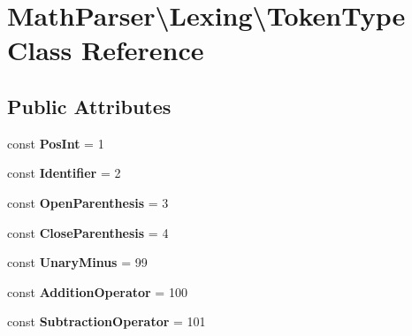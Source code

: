 \hypertarget{classMathParser_1_1Lexing_1_1TokenType}{\section{Math\-Parser\textbackslash{}Lexing\textbackslash{}Token\-Type Class Reference}
\label{classMathParser_1_1Lexing_1_1TokenType}
}
\subsection*{Public Attributes}
\begin{DoxyCompactItemize}
\item 
\hypertarget{classMathParser_1_1Lexing_1_1TokenType_a7312d065593448cb9e873b1d88132749}{const {\bfseries Pos\-Int} = 1}\label{classMathParser_1_1Lexing_1_1TokenType_a7312d065593448cb9e873b1d88132749}

\item 
\hypertarget{classMathParser_1_1Lexing_1_1TokenType_a841cc795a663257447d71c9a31e29945}{const {\bfseries Identifier} = 2}\label{classMathParser_1_1Lexing_1_1TokenType_a841cc795a663257447d71c9a31e29945}

\item 
\hypertarget{classMathParser_1_1Lexing_1_1TokenType_a4b2d997bb88448e1a72e43e171cc6c5f}{const {\bfseries Open\-Parenthesis} = 3}\label{classMathParser_1_1Lexing_1_1TokenType_a4b2d997bb88448e1a72e43e171cc6c5f}

\item 
\hypertarget{classMathParser_1_1Lexing_1_1TokenType_ae70cd224de081c16479ead6674f19131}{const {\bfseries Close\-Parenthesis} = 4}\label{classMathParser_1_1Lexing_1_1TokenType_ae70cd224de081c16479ead6674f19131}

\item 
\hypertarget{classMathParser_1_1Lexing_1_1TokenType_a5bd4c2dc6a366cee15458c0d39f7ff1c}{const {\bfseries Unary\-Minus} = 99}\label{classMathParser_1_1Lexing_1_1TokenType_a5bd4c2dc6a366cee15458c0d39f7ff1c}

\item 
\hypertarget{classMathParser_1_1Lexing_1_1TokenType_af7b57074b5f10d00b3e89502755e7895}{const {\bfseries Addition\-Operator} = 100}\label{classMathParser_1_1Lexing_1_1TokenType_af7b57074b5f10d00b3e89502755e7895}

\item 
\hypertarget{classMathParser_1_1Lexing_1_1TokenType_a3c1e3bc78a1d80bdd85bb67601cb76c6}{const {\bfseries Subtraction\-Operator} = 101}\label{classMathParser_1_1Lexing_1_1TokenType_a3c1e3bc78a1d80bdd85bb67601cb76c6}


\end{DoxyCompactItemize}
